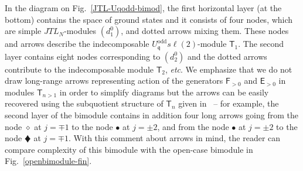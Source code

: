 \documentclass[11pt]{article}
\newcommand{\q}{\mathfrak{q}}
\newcommand{\JTL}[1]{JTL_{#1}}
\newcommand{\LQGodd}{U^{\text{odd}}_{\q} s\ell(2)}
\newcommand{\F}{\mathsf{F}}
\newcommand{\FF}[1]{\F_{#1}}
\newcommand{\E}{\mathsf{E}}
\newcommand{\EE}[1]{\E_{#1}}
\newcommand{\PPodd}[1]{\mathsf{T}_{#1}}
\newcommand{\TLX}{d^0}
\theoremstyle{definition}
\begin{document}
In the diagram on  Fig.~\ref{JTL-Uqodd-bimod}, the first horizontal
layer (at the bottom)  contains the space of ground states
and it consists of four
nodes, which are simple $\JTL{N}$-modules $(\TLX_1)$, and dotted
arrows mixing them. These nodes and arrows describe the indecomposable $\LQGodd$-module
$\PPodd{1}$. The second layer contains eight nodes corresponding to $(\TLX_2)$
and the dotted arrows contribute to the indecomposable module
$\PPodd{2}$, {\it etc}. We emphasize that we do not draw long-range arrows
representing action of the generators $\FF{>0}$ and $\EE{>0}$ in
modules $\PPodd{n>1}$ in order to simplify diagrams but the arrows can
be easily recovered using
the subquotient structure of $\PPodd{n}$ given in~\cite[Sec.~3.3]{GRS2} -- for example, the second layer of the
bimodule contains in addition four long arrows going from the node
$\diamond$ at $j=\mp1$ to the node $\bullet$ at $j=\pm2$, and from the
node $\bullet$ at $j=\pm2$ to the node {\scriptsize$\vardiamond$} at $j=\mp1$. With this
comment about arrows in mind, the reader can compare complexity of
this bimodule with the open-case bimodule in
Fig.~\ref{openbimodule-fin}.
\end{document}
